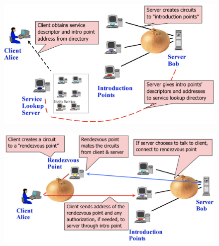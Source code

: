 \documentclass[11pt, a4paper, twoside, italian]{report}
\theoremstyle{plain}
\begin{document}
\begin{multicols}{2}
	\begin{figure}[H]
		\centering
		\includegraphics[scale=0.39]{hserver1}
	\end{figure}
\columnbreak
\setlength{\columnseprule}{0.4pt}
	\begin{figure}[H]
		\centering
		\includegraphics[scale=0.38]{hserver2}
	\end{figure}
\end{multicols}
\end{document}
